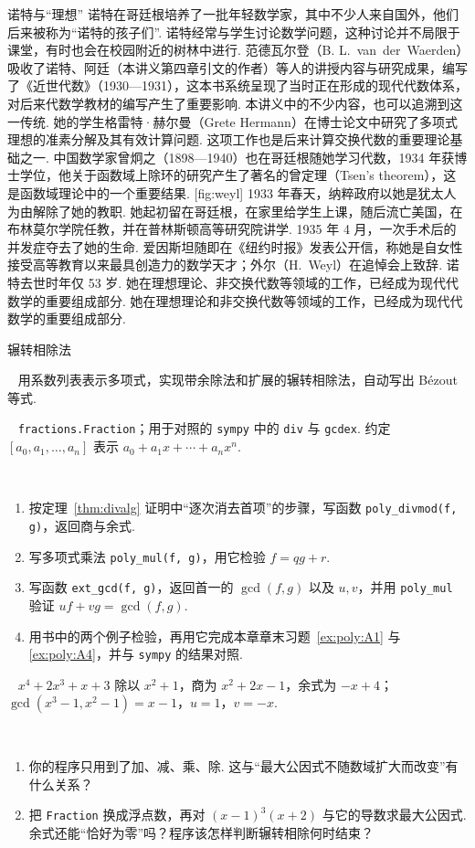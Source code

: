 \documentclass[lang=cn,10.5pt,scheme=chinese,toc=twocol,section,chinesefont=nofont,
twoside,citestyle=gb7714-2015,bibstyle=gb7714-2015]{elegantbook}
\DeclareRobustCommand{\textbf}[1]{{\lnsemiboldlatin\lnsemiboldcjk #1}}
\numberwithin{equation}{section}   %
\newcommand{\mstep}[1]{\par\smallskip\noindent\textbf{【#1】}\ }
\begin{document}
\begin{historybox}{诺特与“理想”}
  诺特在哥廷根培养了一批年轻数学家，其中不少人来自国外，他们后来被称为“诺特的孩子们”. 诺特经常与学生讨论数学问题，这种讨论并不局限于课堂，有时也会在校园附近的树林中进行. 范德瓦尔登（B. L.~van~der~Waerden）吸收了诺特、阿廷（本讲义第四章引文的作者）等人的讲授内容与研究成果，编写了《近世代数》（1930—1931）\cite{vanderwaerden1930moderne}，这本书系统呈现了当时正在形成的现代代数体系，对后来代数学教材的编写产生了重要影响. 本讲义中的不少内容，也可以追溯到这一传统. 她的学生格雷特·赫尔曼（Grete Hermann）在博士论文中研究了多项式理想的准素分解及其有效计算问题. 这项工作也是后来计算交换代数的重要理论基础之一. 中国数学家曾炯之（1898—1940）也在哥廷根随她学习代数，1934 年获博士学位，他关于函数域上除环的研究产生了著名的曾定理（Tsen's theorem），这是函数域理论中的一个重要结果\cite{tsen1933divisionsalgebren}.
  [fig:weyl]
  1933 年春天，纳粹政府以她是犹太人为由解除了她的教职. 她起初留在哥廷根，在家里给学生上课，随后流亡美国，在布林莫尔学院任教，并在普林斯顿高等研究院讲学. 1935 年 4 月，一次手术后的并发症夺去了她的生命. 爱因斯坦随即在《纽约时报》发表公开信，称她是自女性接受高等教育以来最具创造力的数学天才\cite{einstein1935noether}；外尔（H.~Weyl）在追悼会上致辞\cite{weyl1935noether}. 诺特去世时年仅 53 岁. 她在理想理论、非交换代数等领域的工作，已经成为现代代数学的重要组成部分. 她在理想理论和非交换代数等领域的工作，已经成为现代代数学的重要组成部分.
\end{historybox}

\begin{codebox}{辗转相除法}
  \mstep{目标} 用系数列表表示多项式，实现带余除法和扩展的辗转相除法，自动写出 Bézout 等式.

  \mstep{准备} \texttt{fractions.Fraction}；用于对照的 \texttt{sympy} 中的 \texttt{div} 与 \texttt{gcdex}. 约定 $[a_0,a_1,\ldots,a_n]$ 表示 $a_0+a_1x+\cdots+a_nx^n$.

  \mstep{任务}
  \begin{enumerate}
    \item 按定理~\ref{thm:divalg} 证明中“逐次消去首项”的步骤，写函数 \texttt{poly\_divmod(f, g)}，返回商与余式.
    \item 写多项式乘法 \texttt{poly\_mul(f, g)}，用它检验 $f=qg+r$.
    \item 写函数 \texttt{ext\_gcd(f, g)}，返回首一的 $\gcd(f,g)$ 以及 $u,v$，并用 \texttt{poly\_mul} 验证 $uf+vg=\gcd(f,g)$.
    \item 用书中的两个例子检验，再用它完成本章章末习题~\ref{ex:poly:A1} 与 \ref{ex:poly:A4}，并与 \texttt{sympy} 的结果对照.
  \end{enumerate}

  \mstep{检查点} $x^4+2x^3+x+3$ 除以 $x^2+1$，商为 $x^2+2x-1$，余式为 $-x+4$；$\gcd(x^3-1,x^2-1)=x-1$，$u=1$，$v=-x$.

  \mstep{思考}
  \begin{enumerate}
    \item 你的程序只用到了加、减、乘、除. 这与“最大公因式不随数域扩大而改变”有什么关系？
    \item 把 \texttt{Fraction} 换成浮点数，再对 $(x-1)^3(x+2)$ 与它的导数求最大公因式. 余式还能“恰好为零”吗？程序该怎样判断辗转相除何时结束？
  \end{enumerate}
\end{codebox}
\end{document}

